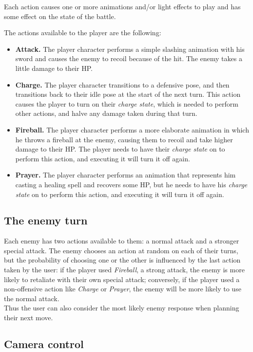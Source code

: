 Each action causes one or more animations and/or light effects to play and has some effect on the state of the battle.

The actions available to the player are the following:

\begin{itemize}
    \item \textbf{Attack.} The player character performs a simple slashing animation with his sword and causes the enemy to recoil because of the hit. The enemy takes a little damage to their HP.
    \item \textbf{Charge.} The player character transitions to a defensive pose, and then transitions back to their idle pose at the start of the next turn. This action causes the player to turn on their \textit{charge state}, which is needed to perform other actions, and halve any damage taken during that turn.
    \item \textbf{Fireball.} The player character performs a more elaborate animation in which he throws a fireball at the enemy, causing them to recoil and take higher damage to their HP. The player needs to have their \textit{charge state} on to perform this action, and executing it will turn it off again.
    \item \textbf{Prayer.} The player character performs an animation that represents him casting a healing spell and  recovers some HP, but he needs to have his \textit{charge state} on to perform this action, and executing it will turn it off again.
\end{itemize}

\subsection{The enemy turn}

Each enemy has two actions available to them: a normal attack and a stronger special attack. The enemy chooses an action at random on each of their turns, but the probability of choosing one or the other is influenced by the last action taken by the user: if the player used \textit{Fireball}, a strong attack, the enemy is more likely to retaliate with their own special attack; conversely, if the player used a non-offensive action like \textit{Charge} or \textit{Prayer}, the enemy will be more likely to use the normal attack.\\
Thus the user can also consider the most likely enemy response when planning their next move.

\subsection{Camera control}

